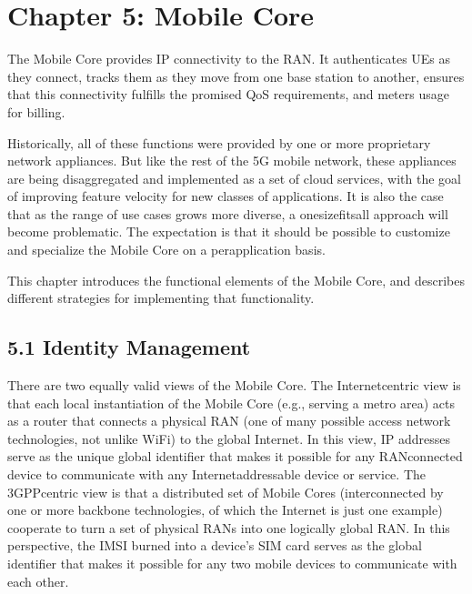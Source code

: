 \documentclass[a4paper,11pt,english]{sphinxmanual}
\begin{document}
\chapter{Chapter 5:  Mobile Core}
\label{\detokenize{core:chapter-5-mobile-core}}\label{\detokenize{core::doc}}
\sphinxAtStartPar
The Mobile Core provides IP connectivity to the RAN. It authenticates
UEs as they connect, tracks them as they move from one base station to
another, ensures that this connectivity fulfills the promised QoS
requirements, and meters usage for billing.

\sphinxAtStartPar
Historically, all of these functions were provided by one or more
proprietary network appliances. But like the rest of the 5G mobile
network, these appliances are being disaggregated and implemented as a
set of cloud services, with the goal of improving feature velocity for
new classes of applications. It is also the case that as the range of
use cases grows more diverse, a one\sphinxhyphen{}size\sphinxhyphen{}fits\sphinxhyphen{}all approach will become
problematic. The expectation is that it should be possible to
customize and specialize the Mobile Core on a per\sphinxhyphen{}application basis.

\sphinxAtStartPar
This chapter introduces the functional elements of the Mobile Core,
and describes different strategies for implementing that
functionality.


\section{5.1  Identity Management}
\label{\detokenize{core:identity-management}}
\sphinxAtStartPar
There are two equally valid views of the Mobile Core. The
Internet\sphinxhyphen{}centric view is that each local instantiation of the Mobile
Core (e.g., serving a metro area) acts as a router that connects a
physical RAN (one of many possible access network technologies, not
unlike WiFi) to the global Internet. In this view, IP addresses serve
as the unique global identifier that makes it possible for any
RAN\sphinxhyphen{}connected device to communicate with any Internet\sphinxhyphen{}addressable
device or service. The 3GPP\sphinxhyphen{}centric view is that a distributed set of
Mobile Cores (interconnected by one or more backbone technologies, of
which the Internet is just one example) cooperate to turn a set of
physical RANs into one logically global RAN. In this perspective, the
IMSI burned into a device’s SIM card serves as the global identifier that
makes it possible for any two mobile devices to communicate with each
other.
\end{document}
